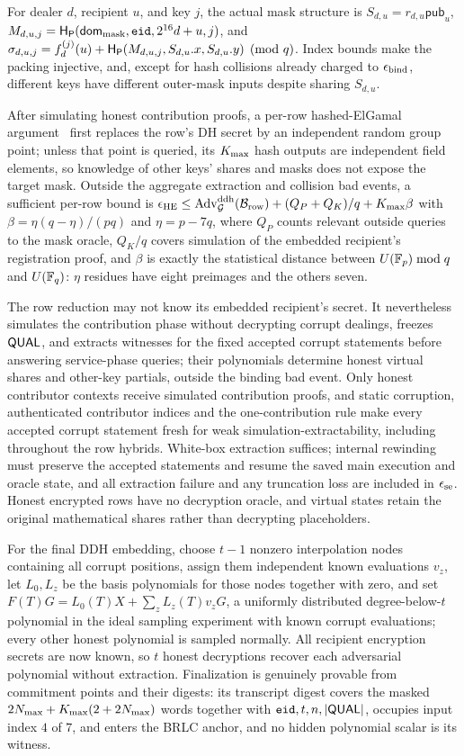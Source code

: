 For dealer $d$, recipient $u$, and key $j$, the actual mask structure is $S_{d,u}=r_{d,u}\mathsf{pub}_u$, $M_{d,u,j}=\mathsf{H}_{\mathsf{P}}(\mathsf{dom}_{\rm mask},\mathtt{eid},2^{16}d+u,j)$, and $\sigma_{d,u,j}=f_d^{(j)}(u)+\mathsf{H}_{\mathsf{P}}(M_{d,u,j},S_{d,u}.x,S_{d,u}.y)\pmod q$. Index bounds make the packing injective, and, except for hash collisions already charged to $\epsilon_{\rm bind}$, different keys have different outer-mask inputs despite sharing $S_{d,u}$.

After simulating honest contribution proofs, a per-row hashed-ElGamal argument~\cite{abdalla_bellare_rogaway_dhies_2001} first replaces the row's DH secret by an independent random group point; unless that point is queried, its $K_{\max}$ hash outputs are independent field elements, so knowledge of other keys' shares and masks does not expose the target mask. Outside the aggregate extraction and collision bad events, a sufficient per-row bound is $\epsilon_{\rm HE}\le\operatorname{Adv}^{\rm ddh}_{\mathcal{G}}(\mathcal{B}_{\rm row})+(Q_P+Q_K)/q+K_{\max}\beta$ with $\beta=\eta(q-\eta)/(pq)$ and $\eta=p-7q$, where $Q_P$ counts relevant outside queries to the mask oracle, $Q_K/q$ covers simulation of the embedded recipient's registration proof, and $\beta$ is exactly the statistical distance between $U(\mathbb{F}_p)\bmod q$ and $U(\mathbb{F}_q)$: $\eta$ residues have eight preimages and the others seven.

The row reduction may not know its embedded recipient's secret. It nevertheless simulates the contribution phase without decrypting corrupt dealings, freezes $\mathsf{QUAL}$, and extracts witnesses for the fixed accepted corrupt statements before answering service-phase queries; their polynomials determine honest virtual shares and other-key partials, outside the binding bad event. Only honest contributor contexts receive simulated contribution proofs, and static corruption, authenticated contributor indices and the one-contribution rule make every accepted corrupt statement fresh for weak simulation-extractability, including throughout the row hybrids. White-box extraction suffices; internal rewinding must preserve the accepted statements and resume the saved main execution and oracle state, and all extraction failure and any truncation loss are included in $\epsilon_{\rm se}$. Honest encrypted rows have no decryption oracle, and virtual states retain the original mathematical shares rather than decrypting placeholders.

For the final DDH embedding, choose $t-1$ nonzero interpolation nodes containing all corrupt positions, assign them independent known evaluations $v_z$, let $L_0,L_z$ be the basis polynomials for those nodes together with zero, and set $F(T)G=L_0(T)X+\sum_z L_z(T)v_zG$, a uniformly distributed degree-below-$t$ polynomial in the ideal sampling experiment with known corrupt evaluations; every other honest polynomial is sampled normally. All recipient encryption secrets are now known, so $t$ honest decryptions recover each adversarial polynomial without extraction. Finalization is genuinely provable from commitment points and their digests: its transcript digest covers the masked $2N_{\max}+K_{\max}(2+2N_{\max})$ words together with $\mathtt{eid},t,n,|\mathsf{QUAL}|$, occupies input index $4$ of $7$, and enters the BRLC anchor, and no hidden polynomial scalar is its witness.

